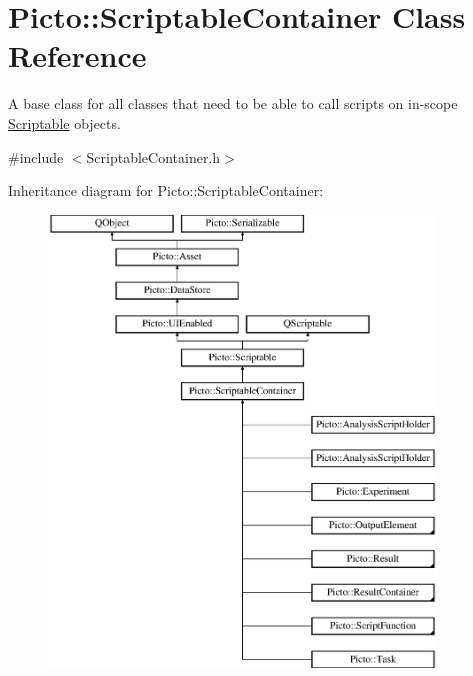 \hypertarget{class_picto_1_1_scriptable_container}{\section{Picto\-:\-:Scriptable\-Container Class Reference}
\label{class_picto_1_1_scriptable_container}
}


A base class for all classes that need to be able to call scripts on in-\/scope \hyperlink{class_picto_1_1_scriptable}{Scriptable} objects.  




{\ttfamily \#include $<$Scriptable\-Container.\-h$>$}

Inheritance diagram for Picto\-:\-:Scriptable\-Container\-:\begin{figure}[H]
\begin{center}
\leavevmode
\includegraphics[height=12.000000cm]{class_picto_1_1_scriptable_container}
\end{center}
\end{figure}
